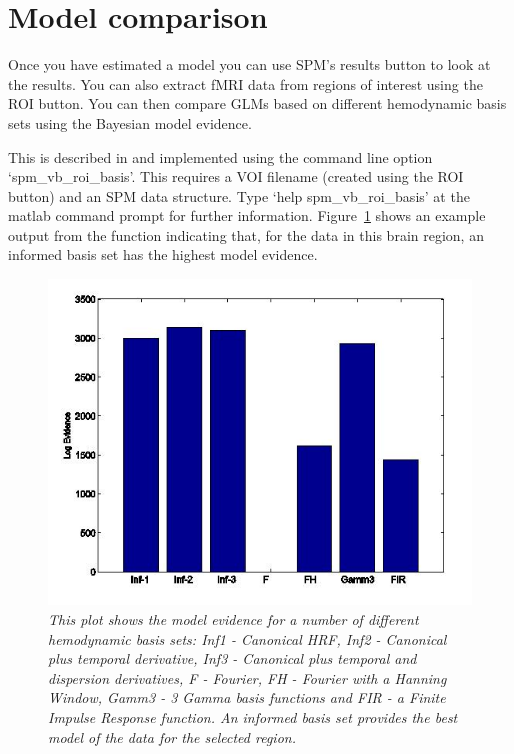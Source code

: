 \section{Model comparison}

Once you have estimated a model you can use SPM's results button
to look at the results. You can also extract fMRI data from 
regions of interest using the ROI button. You 
can then compare GLMs based on different hemodynamic basis sets 
using the Bayesian model evidence. 

This is described in \cite{vb4} and implemented 
using the command line option `spm\_vb\_roi\_basis'. This 
requires a VOI filename (created using the ROI button) and an SPM
data structure. Type `help spm\_vb\_roi\_basis' at the matlab command 
prompt for further information. Figure~\ref{basis} shows an 
example output from the function indicating that, for the data in 
this brain region, an informed basis set has the highest model evidence.

\begin{figure}
\includegraphics[width=150mm]{fmri_est/basis}
\caption{\em This plot shows the model evidence for a number 
of different hemodynamic basis sets: Inf1 - Canonical HRF, Inf2 - Canonical plus temporal derivative, Inf3 - Canonical plus 
temporal and dispersion derivatives, F - Fourier, FH - Fourier 
with a Hanning Window, Gamm3 - 3 Gamma basis functions and FIR - 
a Finite Impulse Response function. An informed basis set provides 
the best model of the data for the selected region.  \label{basis}}
\end{figure}
